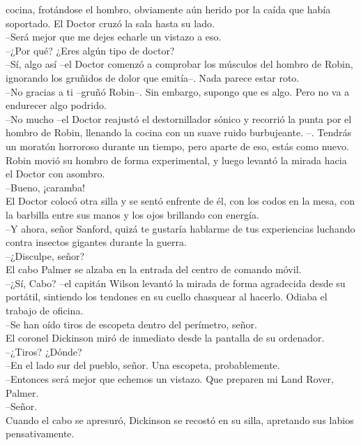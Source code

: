cocina, frotándose el hombro, obviamente aún herido por la caída que
había soportado. El Doctor cruzó la sala hasta su lado.\\
--Será mejor que me dejes echarle un vistazo a eso.\\
--¿Por qué? ¿Eres algún tipo de doctor?\\
--Sí, algo así --el Doctor comenzó a comprobar los músculos del hombro
de Robin, ignorando los gruñidos de dolor que emitía--. Nada parece
estar roto.\\
--No gracias a ti --gruñó Robin--. Sin embargo, supongo que es algo.
Pero no va a endurecer algo podrido.\\
--No mucho --el Doctor reajustó el destornillador sónico y recorrió la
punta por el hombro de Robin, llenando la cocina con un suave ruido
burbujeante. --. Tendrás un moratón horroroso durante un tiempo, pero
aparte de eso, estás como nuevo.\\
Robin movió su hombro de forma experimental, y luego levantó la mirada
hacia el Doctor con asombro.\\
--Bueno, ¡caramba!\\
El Doctor colocó otra silla y se sentó enfrente de él, con los codos en
la mesa, con la barbilla entre sus manos y los ojos brillando con
energía.\\
--Y ahora, señor Sanford, quizá te gustaría hablarme de tus experiencias
luchando contra insectos gigantes durante la
guerra.\\[2\baselineskip]--¿Disculpe, señor?\\
El cabo Palmer se alzaba en la entrada del centro de comando móvil.\\
--¿Sí, Cabo? --el capitán Wilson levantó la mirada de forma agradecida
desde su portátil, sintiendo los tendones en su cuello chasquear al
hacerlo. Odiaba el trabajo de oficina.\\
--Se han oído tiros de escopeta dentro del perímetro, señor.\\
El coronel Dickinson miró de inmediato desde la pantalla de su
ordenador.\\
--¿Tiros? ¿Dónde?\\
--En el lado sur del pueblo, señor. Una escopeta, probablemente.\\
--Entonces será mejor que echemos un vistazo. Que preparen mi Land
Rover, Palmer.\\
--Señor.\\
Cuando el cabo se apresuró, Dickinson se recostó en su silla, apretando
sus labios pensativamente.\\
